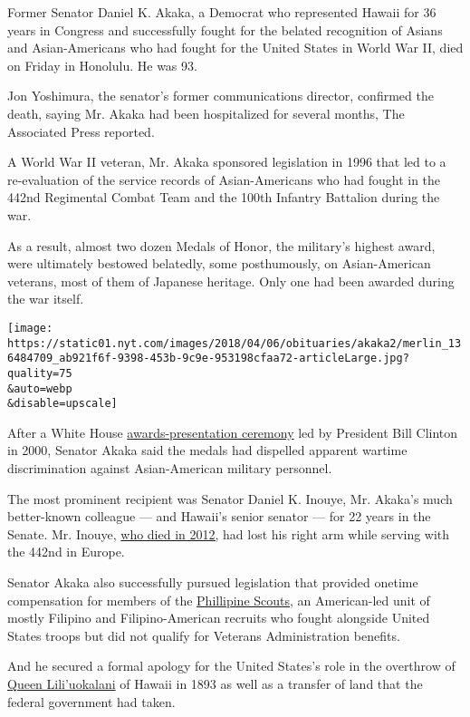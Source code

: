 Former Senator Daniel K. Akaka, a Democrat who represented Hawaii for 36
years in Congress and successfully fought for the belated recognition of
Asians and Asian-Americans who had fought for the United States in World
War II, died on Friday in Honolulu. He was 93.

Jon Yoshimura, the senator's former communications director, confirmed
the death, saying Mr. Akaka had been hospitalized for several months,
The Associated Press reported.

A World War II veteran, Mr. Akaka sponsored legislation in 1996 that led
to a re-evaluation of the service records of Asian-Americans who had
fought in the 442nd Regimental Combat Team and the 100th Infantry
Battalion during the war.

As a result, almost two dozen Medals of Honor, the military's highest
award, were ultimately bestowed belatedly, some posthumously, on
Asian-American veterans, most of them of Japanese heritage. Only one had
been awarded during the war itself.

\texttt{[image: https://static01.nyt.com/images/2018/04/06/obituaries/akaka2/merlin\_136484709\_ab921f6f-9398-453b-9c9e-953198cfaa72-articleLarge.jpg?quality=75\\\&auto=webp\\\&disable=upscale]}

After a White House
\href{https://www.nytimes.com/2000/05/14/us/21-asian-americans-receive-medal-of-honor.html}{awards-presentation
ceremony} led by President Bill Clinton in 2000, Senator Akaka said the
medals had dispelled apparent wartime discrimination against
Asian-American military personnel.

The most prominent recipient was Senator Daniel K. Inouye, Mr. Akaka's
much better-known colleague --- and Hawaii's senior senator --- for 22
years in the Senate. Mr. Inouye,
\href{https://www.nytimes.com/2012/12/18/us/daniel-inouye-hawaiis-quiet-voice-of-conscience-in-senate-dies-at-88.html}{who
died in 2012,} had lost his right arm while serving with the 442nd in
Europe.

Senator Akaka also successfully pursued legislation that provided
onetime compensation for members of the
\href{https://www.army.mil/article/39797/the_us_armys_philippine_scouts}{Phillipine
Scouts}, an American-led unit of mostly Filipino and Filipino-American
recruits who fought alongside United States troops but did not qualify
for Veterans Administration benefits.

And he secured a formal apology for the United States's role in the
overthrow of
\href{https://www.smithsonianmag.com/smart-news/five-things-know-about-liliuokalani-last-queen-hawaii-180967155/}{Queen
Lili'uokalani} of Hawaii in 1893 as well as a transfer of land that the
federal government had taken.

